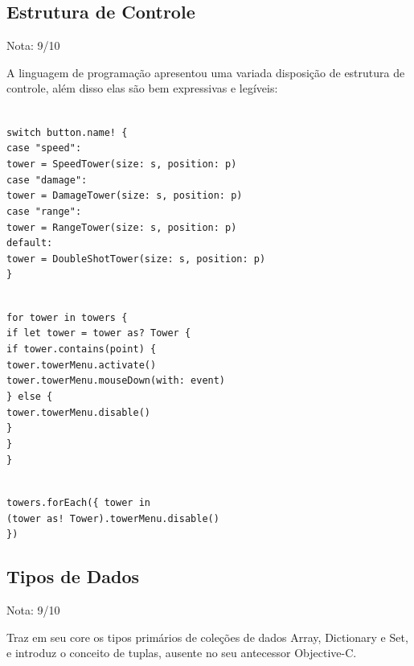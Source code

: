 \documentclass[rel_mlp]{iiufrgs}
\newcommand\tab[1][1cm]{\hspace*{#1}}
\begin{document}
\subsection{Estrutura de Controle}

Nota: 9/10

A linguagem de programação apresentou uma variada disposição de estrutura de controle, além disso elas são bem expressivas e legíveis:

\texttt{
\\switch button.name! \{
\\\tab case "speed":
\\\tab\tab tower = SpeedTower(size: s, position: p)
\\\tab case "damage":
\\\tab\tab tower = DamageTower(size: s, position: p)
\\\tab case "range":
\\\tab\tab tower = RangeTower(size: s, position: p)
\\\tab default:
\\\tab\tab tower = DoubleShotTower(size: s, position: p)
\\\}
}

\texttt{
\\for tower in towers \{
\\\tab if let tower = tower as? Tower \{
\\\tab\tab if tower.contains(point) \{
\\\tab\tab\tab tower.towerMenu.activate()
\\\tab\tab\tab tower.towerMenu.mouseDown(with: event)
\\\tab\tab \} else \{
\\\tab\tab\tab tower.towerMenu.disable()
\\\tab\tab \}
\\\tab \}
\\\}
}

\texttt{
\\towers.forEach(\{ tower in
\\\tab (tower as! Tower).towerMenu.disable()
\\\})
}


\subsection{Tipos de Dados}

Nota: 9/10

Traz em seu core os tipos primários de coleções de dados Array, Dictionary e Set, e introduz o conceito de tuplas, ausente no seu antecessor Objective-C.
\end{document}
